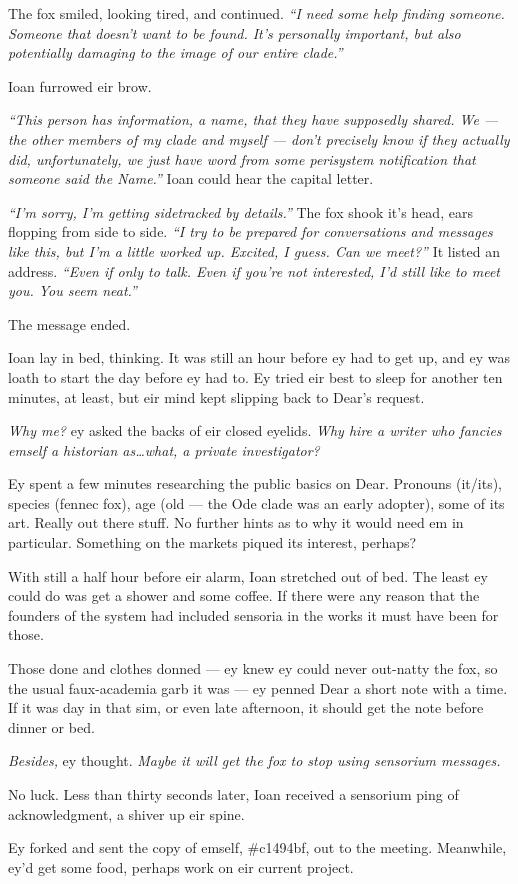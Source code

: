 The fox smiled, looking tired, and continued. \emph{``I need some help finding someone. Someone that doesn't want to be found. It's personally important, but also potentially damaging to the image of our entire clade.''}

Ioan furrowed eir brow.

\emph{``This person has information, a name, that they have supposedly shared. We — the other members of my clade and myself — don't precisely know if they actually did, unfortunately, we just have word from some perisystem notification that someone said the Name.''} Ioan could hear the capital letter.

\emph{``I'm sorry, I'm getting sidetracked by details.''} The fox shook it's head, ears flopping from side to side. \emph{``I try to be prepared for conversations and messages like this, but I'm a little worked up. Excited, I guess. Can we meet?''} It listed an address. \emph{``Even if only to talk. Even if you're not interested, I'd still like to meet you. You seem neat.''}

The message ended.

Ioan lay in bed, thinking. It was still an hour before ey had to get up, and ey was loath to start the day before ey had to. Ey tried eir best to sleep for another ten minutes, at least, but eir mind kept slipping back to Dear's request.

\emph{Why me?} ey asked the backs of eir closed eyelids. \emph{Why hire a writer who fancies emself a historian as\ldots{}what, a private investigator?}

Ey spent a few minutes researching the public basics on Dear. Pronouns (it/its), species (fennec fox), age (old — the Ode clade was an early adopter), some of its art. Really out there stuff. No further hints as to why it would need em in particular. Something on the markets piqued its interest, perhaps?

With still a half hour before eir alarm, Ioan stretched out of bed. The least ey could do was get a shower and some coffee. If there were any reason that the founders of the system had included sensoria in the works it must have been for those.

Those done and clothes donned — ey knew ey could never out-natty the fox, so the usual faux-academia garb it was — ey penned Dear a short note with a time. If it was day in that sim, or even late afternoon, it should get the note before dinner or bed.

\emph{Besides,} ey thought. \emph{Maybe it will get the fox to stop using sensorium messages.}

No luck. Less than thirty seconds later, Ioan received a sensorium ping of acknowledgment, a shiver up eir spine.

Ey forked and sent the copy of emself, \#c1494bf, out to the meeting. Meanwhile, ey'd get some food, perhaps work on eir current project.
